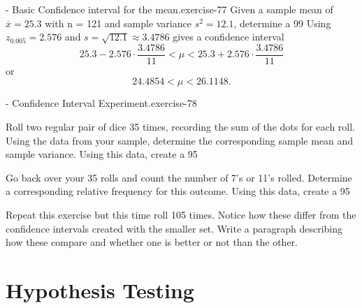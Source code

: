 \documentclass[10pt,]{book}
\numberwithin{equation}{section}
\newcommand{\lt}{<}
\begin{document}
 \begin{inlineexercise}{- Basic Confidence interval for the mean.}{exercise-77}%
\hypertarget{p-1156}{}%
Given a sample mean of \(\overline{x} = 25.3\) with n = 121 and sample variance \(s^2 = 12.1\), determine a 99%
\hypertarget{p-1157}{}%
Using \(z_{0.005} = 2.576\) and \(s = \sqrt{12.1} \approx 3.4786\) gives a confidence interval%
\begin{equation*}
25.3 - 2.576 \cdot \frac{3.4786}{11} \lt \mu \lt 25.3 + 2.576 \cdot \frac{3.4786}{11}
\end{equation*}
or%
\begin{equation*}
24.4854 \lt \mu \lt 26.1148.
\end{equation*}
%
%
\end{inlineexercise}
 \begin{inlineexercise}{- Confidence Interval Experiment.}{exercise-78}%
\hypertarget{p-1158}{}%
%
\end{inlineexercise}
 Roll two regular pair of dice 35 times, recording the sum of the dots for each roll.  Using the data from your sample, determine the corresponding sample mean and sample variance.  Using this data, create a 95%
\par
\hypertarget{p-1159}{}%
Go back over your 35 rolls and count the number of 7's or 11's rolled. Determine a corresponding relative frequency for this outcome. Using this data, create a 95%
\par
\hypertarget{p-1160}{}%
Repeat this exercise but this time roll 105 times.  Notice how these differ from the confidence intervals created with the smaller set.  Write a paragraph describing how these compare and whether one is better or not than the other.%
%
%
\typeout{************************************************}
\typeout{************************************************}
%
\chapter[{Hypothesis Testing}]{Hypothesis Testing}\label{HypothesisTesting}
%
%
\typeout{************************************************}
\typeout{************************************************}
%
\end{document}
